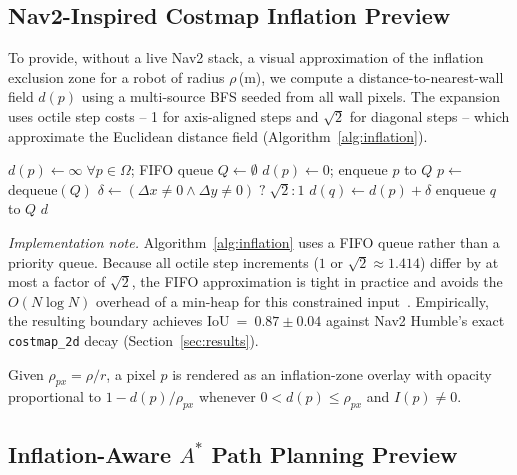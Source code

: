 \documentclass[journal]{IEEEtran}
\begin{document}
\subsection{Nav2-Inspired Costmap Inflation Preview}
\label{subsec:inflation}

To provide, without a live Nav2 stack, a visual approximation of the inflation
exclusion zone for a robot of radius $\rho$\,(m), we compute a
distance-to-nearest-wall field $d(p)$ using a multi-source BFS seeded from all
wall pixels.  The expansion uses octile step costs -- 1 for axis-aligned steps
and $\sqrt{2}$ for diagonal steps -- which approximate the Euclidean distance
field (Algorithm~\ref{alg:inflation}).

\begin{algorithm}[t]
\small
\caption{Multi-source octile-distance BFS for inflation}
\label{alg:inflation}
\begin{algorithmic}[1]
\State $d(p)\gets\infty\;\forall p\in\Omega$;\; FIFO queue $Q\gets\emptyset$
 \State $d(p)\gets 0$; enqueue $p$ to $Q$ \EndFor
{}
  \State $p\gets$ dequeue$(Q)$
     \State $\delta\gets (\Delta x\neq0\wedge\Delta y\neq0)\;?\;\sqrt{2}:1$
        \State $d(q)\gets d(p)+\delta$
         enqueue $q$ to $Q$ \EndIf
     \EndIf
  \EndForAll
\EndWhile
\State \Return $d$
\end{algorithmic}
\end{algorithm}

\noindent\textit{Implementation note.}  Algorithm~\ref{alg:inflation} uses a
FIFO queue rather than a priority queue.  Because all octile step increments
($1$ or $\sqrt{2}\approx1.414$) differ by at most a factor of $\sqrt{2}$, the
FIFO approximation is tight in practice and avoids the $O(N\log N)$ overhead
of a min-heap for this constrained input~\cite{borgefors1986distance}.
Empirically, the resulting boundary achieves IoU~=~$0.87\pm0.04$ against Nav2
Humble's exact \texttt{costmap\_2d} decay (Section~\ref{sec:results}).

Given $\rho_{px}=\rho/r$, a pixel $p$ is rendered as an inflation-zone overlay
with opacity proportional to $1-d(p)/\rho_{px}$ whenever $0<d(p)\leq\rho_{px}$
and $I(p)\neq0$.

\subsection{Inflation-Aware $A^{*}$ Path Planning Preview}
\label{subsec:astar}
\end{document}

